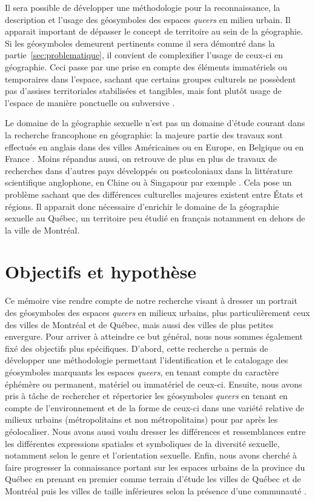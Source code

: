 Il sera possible de développer une méthodologie pour la reconnaissance, la description et l'usage des géosymboles des espaces \emph{queers} en milieu urbain.
Il apparait important de dépasser le concept de territoire au sein de la
géographie.
Si les géosymboles demeurent pertinents comme il sera démontré dans la partie~\ref{sec:problematique}, il convient de complexifier l'usage de ceux-ci en géographie.
Ceci passe par une prise en compte des éléments immatériels ou temporaires dans l'espace, sachant que certains groupes culturels ne possèdent pas d'assises territoriales stabilisées et tangibles, mais font plutôt usage de l'espace de manière ponctuelle ou subversive \parencite{Talburt2012}.

Le domaine de la géographie sexuelle n'est pas un domaine d'étude courant dans
la recherche francophone en géographie: la majeure partie des travaux sont effectués en anglais dans des villes Américaines ou en Europe, en Belgique ou en France \parencite{Blidon2010,Blidon2006,Cattan2010,Deligne2006}.
Moins répandus aussi, on retrouve de plus en plus de travaux de recherches dans d'autres pays développés ou postcoloniaux dans la littérature scientifique anglophone, en Chine ou à Singapour par exemple \parencite{Oswin2014a,Kong2012}.
Cela pose un problème sachant que des différences culturelles majeures existent entre États et régions.
Il apparait donc nécessaire d'enrichir le domaine de la géographie sexuelle au Québec, un territoire peu étudié en français notamment en dehors de la ville de Montréal.


\section*{Objectifs et hypothèse}
Ce mémoire vise rendre compte de notre recherche visant à dresser un portrait des géosymboles des espaces \emph{queers} en milieux urbains, plus particulièrement ceux des villes de Montréal et de Québec, mais aussi des villes de plus petites envergure.
Pour arriver à atteindre ce but général, nous nous sommes également fixé des objectifs plus spécifiques.
D'abord, cette recherche a permis de développer une méthodologie permettant l'identification et le catalogage des géosymboles marquants les espaces \emph{queers}, en tenant compte du caractère éphémère ou permanent, matériel ou immatériel de ceux-ci.
Ensuite, nous avons pris à tâche de rechercher et répertorier les géosymboles \emph{queers} en tenant en compte de l'environnement et de la forme de ceux-ci dans une variété relative de milieux urbains (métropolitains et non métropolitains) pour par après les géolocaliser.
Nous avons aussi voulu dresser les différences et ressemblances entre les différentes expressions spatiales et symboliques de la diversité sexuelle, notamment selon le genre et l'orientation sexuelle.
Enfin, nous avons cherché à faire progresser la connaissance portant sur les espaces \lgbt{} urbains de la province du Québec en prenant en premier comme terrain d'étude les villes de Québec et de Montréal puis les villes de taille inférieures selon la présence d'une communauté \lgbt{}.


